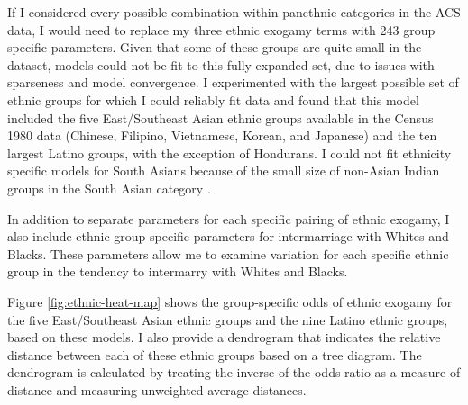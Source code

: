 \documentclass[11pt,]{article}
\begin{document}
If I considered every possible combination within panethnic categories in the ACS data, I would need to replace my three ethnic exogamy terms with 243 group specific parameters. Given that some of these groups are quite small in the dataset, models could not be fit to this fully expanded set, due to issues with sparseness and model convergence. I experimented with the largest possible set of ethnic groups for which I could reliably fit data and found that this model included the five East/Southeast Asian ethnic groups available in the Census 1980 data (Chinese, Filipino, Vietnamese, Korean, and Japanese) and the ten largest Latino groups, with the exception of Hondurans. I could not fit ethnicity specific models for South Asians because of the small size of non-Asian Indian groups in the South Asian category .

In addition to separate parameters for each specific pairing of ethnic exogamy, I also include ethnic group specific parameters for intermarriage with Whites and Blacks. These parameters allow me to examine variation for each specific ethnic group in the tendency to intermarry with Whites and Blacks.

Figure \ref{fig:ethnic-heat-map} shows the group-specific odds of ethnic exogamy for the five East/Southeast Asian ethnic groups and the nine Latino ethnic groups, based on these models. I also provide a dendrogram that indicates the relative distance between each of these ethnic groups based on a tree diagram. The dendrogram is calculated by treating the inverse of the odds ratio as a measure of distance and measuring unweighted average distances.
\end{document}
